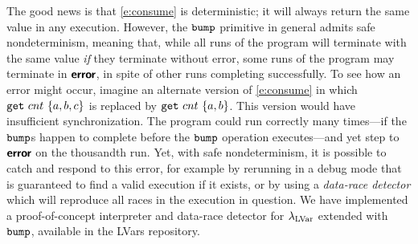 
The good news is that \eqref{e:consume} is deterministic; it
will always return the same value in any execution.  However,
the  $\mbox{\texttt{bump}}$ primitive in general admits safe nondeterminism,
meaning that, while all runs of the program will terminate with the
same value {\em if} they terminate without error, some runs of the
program may terminate in $\textbf{\textsf{error}}$, in spite of other runs completing
successfully.
To see how an error might occur, imagine an alternate version of \eqref{e:consume} 
in which $\mbox{\texttt{get}}~cnt~\{a,b,c\}$ is replaced
by $\mbox{\texttt{get}}~cnt~\{a,b\}$.  This version would have
insufficient synchronization.  The program could run correctly many
times---if the $\mbox{\texttt{bump}}$s happen to complete before the
$\mbox{\texttt{bump}}$ operation executes---and yet step to $\textbf{\textsf{error}}$ on the
thousandth run.
%
{Yet, with safe nondeterminism, it is possible to catch and respond to
this error, for example by rerunning in a debug mode that is guaranteed
to find a valid execution if it exists, or by using a {\em data-race detector} which will
reproduce all races in the execution in question.
%
We have implemented a proof-of-concept interpreter and data-race detector for
$\lambda_{\textrm{LVar}}$ extended with $\mbox{\texttt{bump}}$, available in the LVars repository}.

